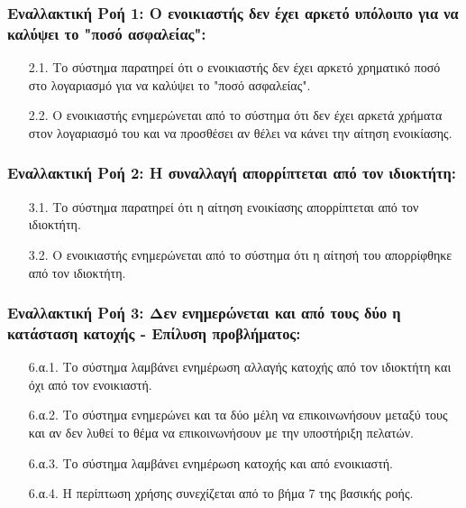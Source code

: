 \documentclass[12pt,a4paper]{article}
\begin{document}
\subsubsection*{Εναλλακτική Ροή 1: Ο ενοικιαστής δεν έχει αρκετό υπόλοιπο για να καλύψει το "ποσό ασφαλείας":}
\begin{enumerate}
    \item[2.1.] Το σύστημα παρατηρεί ότι ο ενοικιαστής δεν έχει αρκετό χρηματικό ποσό στο λογαριασμό για να καλύψει το "ποσό ασφαλείας".
    \item[2.2.] Ο ενοικιαστής ενημερώνεται από το σύστημα ότι δεν έχει αρκετά χρήματα στον λογαριασμό του και να προσθέσει αν θέλει να κάνει την αίτηση ενοικίασης.
\end{enumerate}

\subsubsection*{Εναλλακτική Ροή 2: Η συναλλαγή απορρίπτεται από τον ιδιοκτήτη:}
\begin{enumerate}
    \item[3.1.] Το σύστημα παρατηρεί ότι η αίτηση ενοικίασης απορρίπτεται από τον ιδιοκτήτη.
    \item[3.2.] Ο ενοικιαστής ενημερώνεται από το σύστημα ότι η αίτησή του απορρίφθηκε από τον ιδιοκτήτη.
\end{enumerate}

\subsubsection*{Εναλλακτική Ροή 3: Δεν ενημερώνεται και από τους δύο η κατάσταση κατοχής - Επίλυση προβλήματος:}
\begin{enumerate}
    \item[6.α.1.] Το σύστημα λαμβάνει ενημέρωση αλλαγής κατοχής από τον ιδιοκτήτη και όχι από τον ενοικιαστή.
    \item[6.α.2.] Το σύστημα ενημερώνει και τα δύο μέλη να επικοινωνήσουν μεταξύ τους και αν δεν λυθεί το θέμα να επικοινωνήσουν με την υποστήριξη πελατών.
    \item[6.α.3.] Το σύστημα λαμβάνει ενημέρωση κατοχής και από ενοικιαστή.
    \item[6.α.4.] Η περίπτωση χρήσης συνεχίζεται από το βήμα 7 της βασικής ροής.
\end{enumerate}
\end{document}
